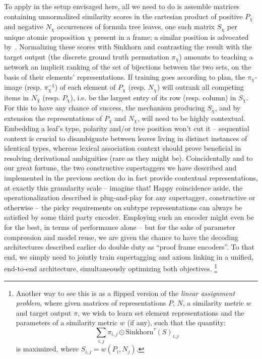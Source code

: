 To apply in the setup envisaged here, all we need to do is assemble matrices containing unnormalized similarity scores in the cartesian product of positive $P_{\chi}$ and negative $N_{\chi}$ occurrences of formula tree leaves, one such matrix $S_{\chi}$ per unique atomic proposition $\chi$ present in a frame; a similar position is advocated by~\citet{moot2008graph}.
Normalizing these scores with Sinkhorn and contrasting the result with the target output (the discrete ground truth permutation $\pi_{\chi}$) amounts to teaching a network an implicit ranking of the set of bijections between the two sets, on the basis of their elements' representations.
If training goes according to plan, the $\pi_{\chi}$-image (resp. $\pi_{\chi}^{-1}$) of each element of $P_{\chi}$ (resp. $N_{\chi}$) will outrank all competing items in $N_{\chi}$ (resp. $P_{\chi}$), i.e. be the largest entry of its row (resp. column) in $S_{\chi}$.
For this to have any chance of success, the mechanism producing $S_{\chi}$, and by extension the representations of $P_{\chi}$ and $N_{\chi}$, will need to be highly contextual.
Embedding a leaf's type, polarity and/or tree position won't cut it -- sequential context is crucial to disambiguate between leaves living in distinct instances of identical types, whereas lexical association context should prove beneficial in resolving derivational ambiguities (rare as they might be).
Coincidentally and to our great fortune, the two constructive supertaggers we have described and implemented in the previous section do in fact provide contextual representations, at exactly this granularity scale -- imagine that!
Happy coincidence aside, the operationalization described is plug-and-play for any supertagger, constructive or otherwise -- the picky requirements on subtype representations can always be satisfied by some third party encoder.
Employing such an encoder might even be for the best, in terms of performance alone -- but for the sake of parameter compression and model reuse, we are given the chance to have the decoding architectures described earlier do double duty as ``proof frame encoders''.
To that end, we simply need to jointly train supertagging and axiom linking in a unified, end-to-end architecture, simultaneously optimizing both objectives.%
	\footnote{
	Another way to see this is as a flipped version of the \textit{linear assignment problem}, where given matrices of representations $P$, $N$, a similarity metric $w$ and target output $\pi$, we wish to learn set element representations and the parameters of a similarity metric $w$ (if any), such that the quantity:
	\[
		\sum_{i, j} \pi_{i,j} \odot \mathrm{Sinkhorn}^{\tau}(S)_{i,j}
	\]
	is maximized, where $S_{i,j} = w(P_i, N_j)$.
}

